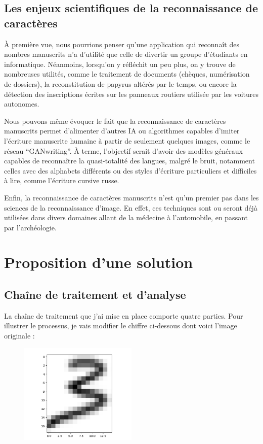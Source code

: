 \documentclass{article}
\begin{document}
\subsection{Les enjeux scientifiques de la reconnaissance de caractères}
À première vue, nous pourrions penser qu'une application qui reconnaît des nombres manuscrits n'a d'utilité que celle de divertir un groupe d'étudiants en informatique. Néanmoins, lorsqu'on y réfléchit un peu plus, on y trouve de nombreuses utilités, comme le traitement de documents (chèques, numérisation de dossiers), la reconstitution de papyrus altérés par le temps, ou encore la détection des inscriptions écrites sur les panneaux routiers utilisée par les voitures autonomes.

Nous pouvons même évoquer le fait que la reconnaissance de caractères manuscrits permet d'alimenter d'autres IA ou algorithmes capables d'imiter l'écriture manuscrite humaine à partir de seulement quelques images, comme le réseau ``GANwriting''. À terme, l'objectif serait d'avoir des modèles généraux capables de reconnaître la quasi-totalité des langues, malgré le bruit, notamment celles avec des alphabets différents ou des styles d'écriture particuliers et difficiles à lire, comme l'écriture cursive russe. 

Enfin, la reconnaissance de caractères manuscrits n'est qu'un premier pas dans les sciences de la reconnaissance d'image. En effet, ces techniques sont ou seront déjà utilisées dans divers domaines allant de la médecine à l'automobile, en passant par l'archéologie. 

\section{Proposition d’une solution}

\subsection{Chaîne de traitement et d'analyse}
La chaîne de traitement que j'ai mise en place comporte quatre parties. Pour illustrer le processus, je vais modifier le chiffre ci-dessous dont voici l'image originale : 

\begin{figure}[h!]
    \centering
    \includegraphics[width=0.5\textwidth]{images/original_picture.png}
\end{figure}
\end{document}
